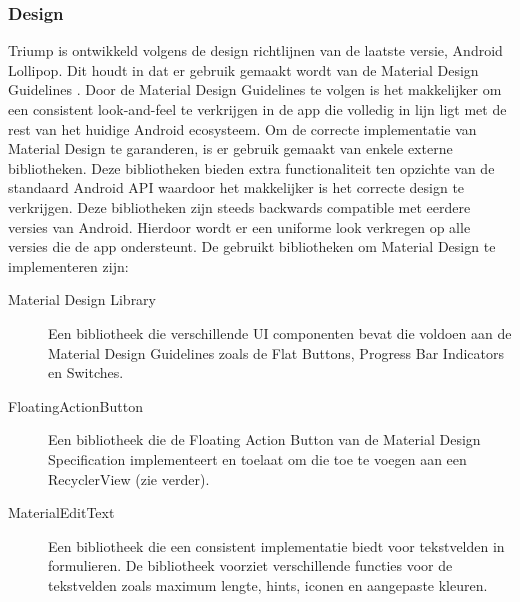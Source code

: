\subsubsection{Design}
Triump is ontwikkeld volgens de design richtlijnen van de laatste versie, Android Lollipop. Dit houdt in dat er gebruik gemaakt wordt van de Material Design Guidelines \cite{Material_Design}. Door de Material Design Guidelines te volgen is het makkelijker om een consistent look-and-feel te verkrijgen in de app die volledig in lijn ligt met de rest van het huidige Android ecosysteem.
Om de correcte implementatie van Material Design te garanderen, is er gebruik gemaakt van enkele externe bibliotheken. Deze bibliotheken bieden extra functionaliteit ten opzichte van de standaard Android API waardoor het makkelijker is het correcte design te verkrijgen. Deze bibliotheken zijn steeds backwards compatible met eerdere versies van Android. Hierdoor wordt er een uniforme look verkregen op alle versies die de app ondersteunt.
De gebruikt bibliotheken om Material Design te implementeren zijn:
\begin{description}
	\item[Material Design Library \cite{navasmdc}] Een bibliotheek die verschillende UI componenten bevat die voldoen aan de Material Design Guidelines zoals de Flat Buttons, Progress Bar Indicators en Switches.
	\item[FloatingActionButton \cite{floatingactionbutton}] Een bibliotheek die de Floating Action Button van de Material Design Specification implementeert en toelaat om die toe te voegen aan een RecyclerView (zie verder).
	\item[MaterialEditText \cite{materialedittext}] Een bibliotheek die een consistent implementatie biedt voor tekstvelden in formulieren. De bibliotheek voorziet verschillende functies voor de tekstvelden zoals maximum lengte, hints, iconen en aangepaste kleuren.
\end{description}

